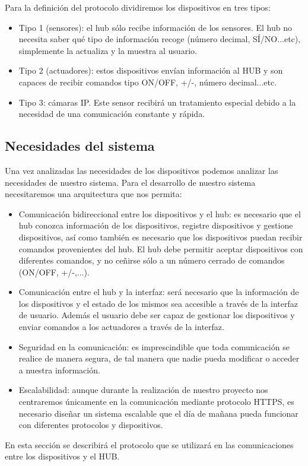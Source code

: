 Para la definición del protocolo dividiremos los dispositivos en tres tipos:
\begin{itemize}
\item Tipo 1 (sensores): el hub sólo recibe información de los sensores. El hub no necesita saber qué tipo de información recoge (número decimal, SÍ/NO...etc), simplemente la actualiza y la muestra al usuario.
\item Tipo 2 (actuadores): estos dispositivos envían información al HUB y son capaces de recibir comandos tipo ON/OFF, +/-, número decimal...etc.
\item Tipo 3: cámaras IP. Este sensor recibirá un tratamiento especial debido a la necesidad de una comunicación constante y rápida.
\end{itemize}
\subsection{Necesidades del sistema}
Una vez analizadas las necesidades de los dispositivos podemos analizar las necesidades de nuestro sistema.
Para el desarrollo de nuestro sistema necesitaremos una arquitectura que nos permita:
\begin{itemize}
\item Comunicación bidireccional entre los dispositivos y el hub: es necesario que el hub conozca información de los dispositivos, 
registre dispositivos y gestione dispositivos, así como también es necesario que los dispositivos puedan recibir comandos provenientes
del hub. El hub debe permitir aceptar dispositivos con diferentes comandos, y no ceñirse sólo a un número cerrado de comandos (ON/OFF, +/-,...).
\item Comunicación entre el hub y la interfaz: será necesario que la información de los dispositivos y el estado de los mismos sea accesible
a través de la interfaz de usuario. Además el usuario debe ser capaz de gestionar los dispositivos y enviar comandos a los actuadores
a través de la interfaz.
\item Seguridad en la comunicación: es imprescindible que toda comunicación se realice de manera segura, de tal manera que nadie pueda modificar o
acceder a nuestra información.
\item Escalabilidad: aunque durante la realización de nuestro proyecto nos centraremos únicamente en la comunicación mediante protocolo HTTPS, 
es necesario diseñar un sistema escalable que el día de mañana pueda funcionar con diferentes protocolos y dispositivos.
\end{itemize}
En esta sección se describirá el protocolo que se utilizará en las comunicaciones entre los dispositivos y el HUB.
